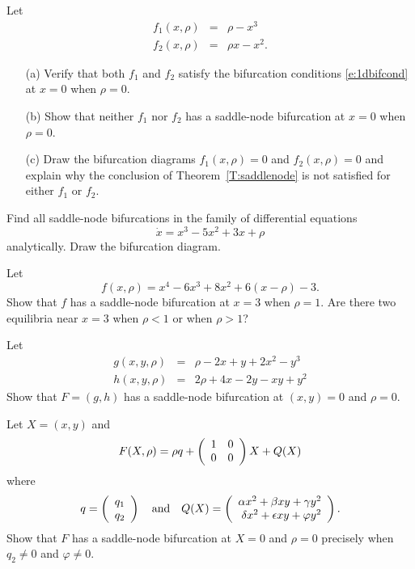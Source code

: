 \documentclass{ximera}
\begin{document}
\begin{exercise} \label{c9.3.1}
Let 
\begin{eqnarray*}
f_1(x,\rho) & = & \rho - x^3 \\
f_2(x,\rho) & = & \rho x - x^2.
\end{eqnarray*}
\begin{itemize}
\item[(a)] Verify that both $f_1$ and $f_2$ satisfy the bifurcation conditions 
\eqref{e:1dbifcond} at $x=0$ when $\rho=0$.
\item[(b)] Show that neither $f_1$ nor $f_2$ has a saddle-node bifurcation
at $x=0$ when $\rho=0$. 
\item[(c)] Draw the bifurcation diagrams $f_1(x,\rho)=0$ and 
$f_2(x,\rho)=0$ and explain why the conclusion of 
Theorem~\ref{T:saddlenode} is not satisfied for either $f_1$ 
or $f_2$.
\end{itemize}
\end{exercise}

\begin{exercise} \label{c9.3.5}
Find all saddle-node bifurcations in the 
family of differential equations
\begin{equation}
\dot{x} = x^3 -5x^2 + 3x + \rho
\end{equation}
analytically.  Draw the bifurcation diagram.
\end{exercise}

\begin{exercise} \label{c9.3.2}
Let 
\[
f(x,\rho) = x^4 - 6x^3 +8x^2 + 6(x-\rho) - 3.
\]
Show that $f$ has a saddle-node bifurcation at $x=3$ when $\rho=1$. 
Are there two equilibria near $x=3$ when $\rho<1$ or when $\rho>1$?
\end{exercise}

\begin{exercise} \label{c9.3.3}
Let 
\begin{eqnarray*}
g(x,y,\rho) & = &  \rho - 2x +  y + 2x^2 - y^3 \\
h(x,y,\rho) & = & 2\rho + 4x - 2y -  xy  + y^2
\end{eqnarray*}
Show that $F=(g,h)$ has a saddle-node bifurcation at $(x,y)=0$ and 
$\rho=0$.
\end{exercise}


\begin{exercise} \label{c9.3.4}
Let $X=(x,y)$ and 
\[
F(X,\rho) = \rho q + \left(\begin{array}{rr} 1 & 0\\ 0 &0\end{array}\right) X + Q(X)
\]
where
\[
q=\left(\begin{array}{r} q_1 \\ q_2\end{array}\right) \quad\mbox{and}\quad Q(X) = \left(\begin{array}{r} \alpha x^2+\beta xy+\gamma y^2 \\ \delta x^2 +\epsilon xy+\varphi y^2\end{array}\right).
\]
Show that $F$ has a saddle-node bifurcation at $X=0$ and $\rho=0$ precisely 
when $q_2\neq 0$ and $\varphi\neq 0$. 
\end{exercise}
\end{document}
